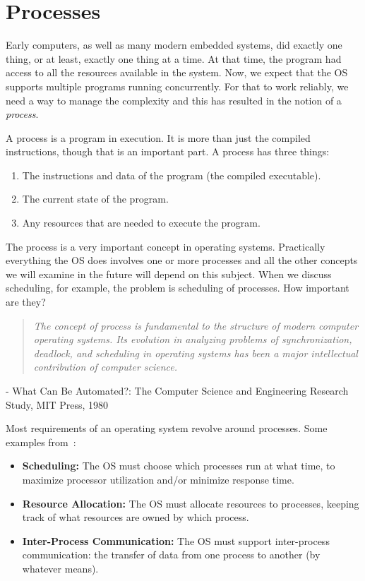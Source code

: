 




\section*{Processes}

Early computers, as well as many modern embedded systems, did exactly one thing, or at least, exactly one thing at a time. At that time, the program had access to all the resources available in the system. Now, we expect that the OS supports multiple programs running concurrently. For that to work reliably, we need a way to manage the complexity and this has resulted in the notion of a \textit{process}.

A process is a program in execution. It is more than just the compiled instructions, though that is an important part. A process has three things:

\begin{enumerate}
	\item The instructions and data of the program (the compiled executable).
	\item The current state of the program.
	\item Any resources that are needed to execute the program.
\end{enumerate}

The process is a very important concept in operating systems. Practically everything the OS does involves one or more processes and all the other concepts we will examine in the future will depend on this subject. When we discuss scheduling, for example, the problem is scheduling of processes. How important are they? 

\begin{quote}
\textit{The concept of process is fundamental to the structure of modern computer operating systems. Its evolution in analyzing problems of synchronization, deadlock, and scheduling in operating systems has been a major intellectual contribution of computer science.}
\end{quote}\vspace{-1.5em}
\hfill - What Can Be Automated?: The Computer Science and Engineering Research Study, MIT Press, 1980

Most requirements of an operating system revolve around processes. Some examples from~\cite{osi}:
\begin{itemize}
	\item \textbf{Scheduling:} The OS must choose which processes run at what time, to maximize processor utilization and/or minimize response time.
	\item \textbf{Resource Allocation:} The OS must allocate resources to processes, keeping track of what resources are owned by which process.
	\item \textbf{Inter-Process Communication:} The OS must support inter-process communication: the transfer of data from one process to another (by whatever means).
\end{itemize}

